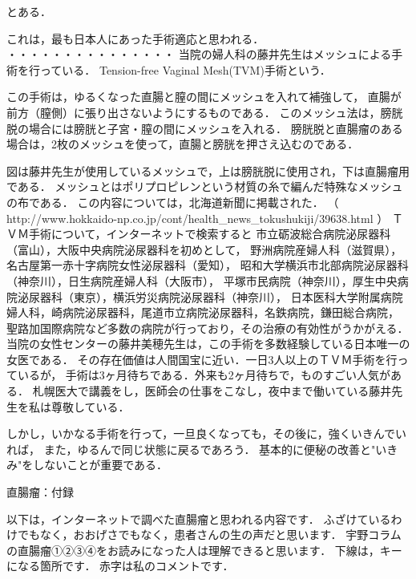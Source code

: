 とある．

これは，最も日本人にあった手術適応と思われる．
・・・・・・・・・・・・・・・
当院の婦人科の藤井先生はメッシュによる手術を行っている．
Tension-free Vaginal Mesh(TVM)手術という． 





この手術は，ゆるくなった直腸と膣の間にメッシュを入れて補強して，
直腸が前方（膣側）に張り出さないようにするものである．
このメッシュ法は，膀胱脱の場合には膀胱と子宮・膣の間にメッシュを入れる．
膀胱脱と直腸瘤のある場合は，2枚のメッシュを使って，直腸と膀胱を押さえ込むのである．





図は藤井先生が使用しているメッシュで，上は膀胱脱に使用され，下は直腸瘤用である．
メッシュとはポリプロピレンという材質の糸で編んだ特殊なメッシュの布である．
この内容については，北海道新聞に掲載された．
（ http://www.hokkaido-np.co.jp/cont/health_news_tokushukiji/39638.html ） 
ＴＶＭ手術について，インターネットで検索すると
市立砺波総合病院泌尿器科（富山），大阪中央病院泌尿器科を初めとして，
野洲病院産婦人科（滋賀県），名古屋第一赤十字病院女性泌尿器科（愛知），
昭和大学横浜市北部病院泌尿器科（神奈川），日生病院産婦人科（大阪市），
平塚市民病院（神奈川），厚生中央病院泌尿器科（東京），横浜労災病院泌尿器科（神奈川），
日本医科大学附属病院婦人科，崎病院泌尿器科，尾道市立病院泌尿器科，名鉄病院，鎌田総合病院，
聖路加国際病院など多数の病院が行っており，その治療の有効性がうかがえる．
当院の女性センターの藤井美穂先生は，この手術を多数経験している日本唯一の女医である．
その存在価値は人間国宝に近い．一日3人以上のＴＶＭ手術を行っているが，
手術は3ヶ月待ちである．外来も2ヶ月待ちで，ものすごい人気がある．
札幌医大で講義をし，医師会の仕事をこなし，夜中まで働いている藤井先生を私は尊敬している． 

しかし，いかなる手術を行って，一旦良くなっても，その後に，強くいきんでいれば，
また，ゆるんで同じ状態に戻るであろう．
基本的に便秘の改善と"いきみ"をしないことが重要である．

	
 		







直腸瘤：付録

以下は，インターネットで調べた直腸瘤と思われる内容です．
ふざけているわけでもなく，おおげさでもなく，患者さんの生の声だと思います．
宇野コラムの直腸瘤①②③④をお読みになった人は理解できると思います．
下線は，キーになる箇所です．
赤字は私のコメントです．



